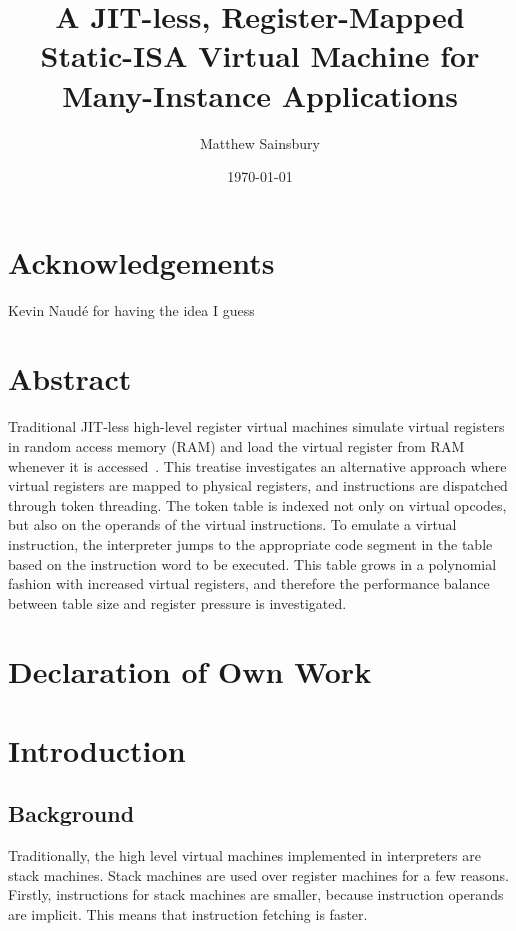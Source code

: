 



\title{A JIT-less, Register-Mapped Static-ISA Virtual Machine for Many-Instance Applications}
\author{Matthew Sainsbury}
\date{\today}

\begin{titlepage}
	\maketitle
\end{titlepage}


\chapter*{Acknowledgements}
Kevin Naudé for having the idea I guess

\chapter*{Abstract}
Traditional JIT-less high-level register virtual machines simulate virtual registers in random access memory (RAM) and load the virtual register from RAM whenever it is accessed~\citep{caseregistervm}. This treatise investigates an alternative approach where virtual registers are mapped to physical registers, and instructions are dispatched through token threading. The token table is indexed not only on virtual opcodes, but also on the operands of the virtual instructions. To emulate a virtual instruction, the interpreter jumps to the appropriate code segment in the table based on the instruction word to be executed. This table grows in a polynomial fashion with increased virtual registers, and therefore the performance balance between table size and register pressure is investigated.

\chapter*{Declaration of Own Work}

\tableofcontents



\chapter{Introduction}
	\startrealnumbers
		
	\section{Background}
	Traditionally, the high level virtual machines implemented in interpreters are stack machines. Stack machines are used over register machines for a few reasons. Firstly, instructions for stack machines are smaller, because instruction operands are implicit.  This means that instruction fetching is faster. 
	
